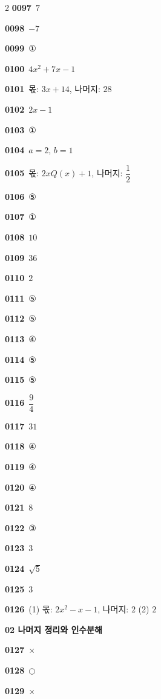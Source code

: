 \documentclass[10pt,a4paper]{article}
\begin{document}
\begin{multicols}{2}
\noindent\textbf{0097}\ $7$\par
\noindent\textbf{0098}\ $-7$\par
\noindent\textbf{0099}\ ①\par
\noindent\textbf{0100}\ $4x^2+7x-1$\par
\noindent\textbf{0101}\ 몫: $3x+14$, 나머지: $28$\par
\noindent\textbf{0102}\ $2x-1$\par
\noindent\textbf{0103}\ ①\par
\noindent\textbf{0104}\ $a=2$, $b=1$\par
\noindent\textbf{0105}\ 몫: $2xQ(x)+1$, 나머지: $\dfrac{1}{2}$\par
\noindent\textbf{0106}\ ⑤\par
\noindent\textbf{0107}\ ①\par
\noindent\textbf{0108}\ $10$\par
\noindent\textbf{0109}\ $36$\par
\noindent\textbf{0110}\ $2$\par
\noindent\textbf{0111}\ ⑤\par
\noindent\textbf{0112}\ ⑤\par
\noindent\textbf{0113}\ ④\par
\noindent\textbf{0114}\ ⑤\par
\noindent\textbf{0115}\ ⑤\par
\noindent\textbf{0116}\ $\dfrac{9}{4}$\par
\noindent\textbf{0117}\ $31$\par
\noindent\textbf{0118}\ ④\par
\noindent\textbf{0119}\ ④\par
\noindent\textbf{0120}\ ④\par
\noindent\textbf{0121}\ $8$\par
\noindent\textbf{0122}\ ③\par
\noindent\textbf{0123}\ $3$\par
\noindent\textbf{0124}\ $\sqrt{5}$\par
\noindent\textbf{0125}\ $3$\par
\noindent\textbf{0126}\ (1) 몫: $2x^2-x-1$, 나머지: $2$ (2) $2$\par
\noindent\textbf{02 나머지 정리와 인수분해}\par\smallskip
\noindent\textbf{0127}\ $\times$\par
\noindent\textbf{0128}\ $\bigcirc$\par
\noindent\textbf{0129}\ $\times$\par

\end{multicols}
\end{document}
